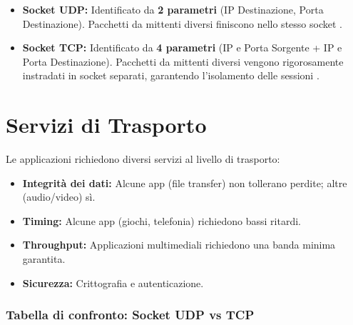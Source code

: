 \documentclass[a4paper,12pt]{report}
\begin{document}
\begin{tcolorbox}[colback=blue!5!white, colframe=blue!75!black, title=\textbf{Sintesi per l'esame}]
\begin{itemize}[leftmargin=*]
    \item \textbf{Socket UDP:} Identificato da \textbf{2 parametri} (IP Destinazione, Porta Destinazione). Pacchetti da mittenti diversi finiscono nello stesso socket .
    \item \textbf{Socket TCP:} Identificato da \textbf{4 parametri} (IP e Porta Sorgente + IP e Porta Destinazione). Pacchetti da mittenti diversi vengono rigorosamente instradati in socket separati, garantendo l'isolamento delle sessioni .
\end{itemize}
\end{tcolorbox}



\newpage
\section*{Servizi di Trasporto}
Le applicazioni richiedono diversi servizi al livello di trasporto:
\begin{itemize}
    \item \textbf{Integrità dei dati:} Alcune app (file transfer) non tollerano perdite; altre (audio/video) sì.
    \item \textbf{Timing:} Alcune app (giochi, telefonia) richiedono bassi ritardi.
    \item \textbf{Throughput:} Applicazioni multimediali richiedono una banda minima garantita.
    \item \textbf{Sicurezza:} Crittografia e autenticazione.
\end{itemize}

\subsubsection{Tabella di confronto: Socket UDP vs TCP}
\end{document}
